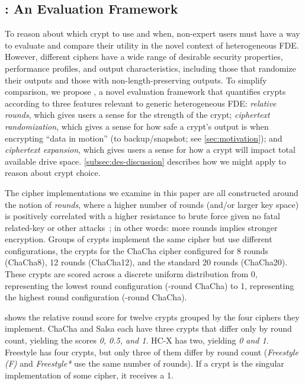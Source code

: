 \subsection{\sysC: An Evaluation Framework}\label{subsec:des-trade}

To reason about which crypt to use and when, non-expert users must have a way to
evaluate and compare their utility in the novel context of heterogeneous FDE.
However, different ciphers have a wide range of desirable security properties,
performance profiles, and output characteristics, including those that randomize
their outputs and those with non-length-preserving outputs. To simplify
comparison, we propose \sysC, a novel evaluation framework that quantifies
crypts according to three features relevant to generic heterogeneous FDE: {\em
relative rounds}, which gives users a sense for the strength of the crypt; {\em
ciphertext randomization}, which gives a sense for how safe a crypt's output is
when encrypting ``data in motion'' (\eg to backup/snapshot; see
\cref{sec:motivation}); and {\em ciphertext expansion}, which gives users a
sense for how a crypt will impact total available drive space.
\cref{subsec:des-discussion} describes how we might apply \sysC to reason about
crypt choice.




 The cipher implementations we examine in this
paper are all constructed around the notion of {\em rounds}, where a higher
number of rounds (and/or larger key space) is positively correlated with a
higher resistance to brute force given no fatal related-key or other
attacks~\cite{ChaCha-Cryptanalysis}; in other words: more rounds implies
stronger encryption. Groups of crypts implement the same cipher but use
different configurations, \eg the crypts for the ChaCha cipher configured for 8
rounds (ChaCha8), 12 rounds (ChaCha12), and the standard 20 rounds (ChaCha20).
These crypts are scored across a discrete uniform distribution from 0,
representing the lowest round configuration (-round ChaCha) to 1,
representing the highest round configuration (-round ChaCha).

 shows the relative round score for twelve crypts grouped by the
four ciphers they implement. ChaCha and Salsa each have three crypts that differ
only by round count, yielding the scores {\em 0, 0.5, and 1}. HC-X has two,
yielding {\em 0 and 1}. Freestyle has four crypts, but only three of them differ
by round count ({\em Freestyle (F)} and {\em Freestyle*} use the same number of
rounds). If a crypt is the singular implementation of some cipher, it receives a
1.

